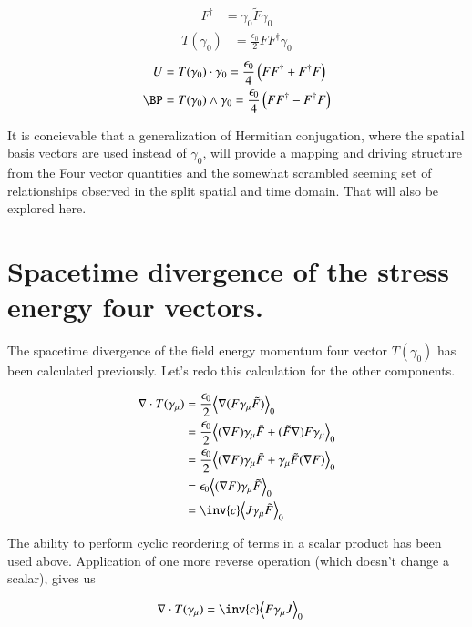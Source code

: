 \documentclass{article}
\begin{document}
\begin{align}
F^\dagger &= \gamma_0 \tilde{F} \gamma_0
\end{align}
\begin{align}
T(\gamma_0) &= \frac{\epsilon_0}{2} F F^\dagger \gamma_0
\end{align}
\begin{align}
U &= T(\gamma_0) \cdot \gamma_0 = \frac{\epsilon_0}{4} \left(F F^\dagger + F^\dagger F \right) \\
\BP &= T(\gamma_0) \wedge \gamma_0 = \frac{\epsilon_0}{4} \left(F F^\dagger - F^\dagger F \right)
\end{align}

It is concievable that a generalization of Hermitian conjugation, where the spatial basis vectors are used instead of $\gamma_0$, will 
provide a mapping and driving structure from the Four vector quantities and the somewhat scrambled seeming set
of relationships observed in the split spatial and time domain.  That will also be explored here.

\section{ Spacetime divergence of the stress energy four vectors. }

The spacetime divergence of the field energy momentum four vector $T(\gamma_0)$ has been calculated previously.  Let's redo this 
calculation for the other components.

\begin{align*}
\grad \cdot T(\gamma_\mu) 
&= \frac{\epsilon_0}{2} \gpgradezero{ \grad (F \gamma_\mu \tilde{F}) } \\
&= \frac{\epsilon_0}{2} \gpgradezero{ (\grad F) \gamma_\mu \tilde{F} + (\tilde{F} \grad) F \gamma_\mu } \\
&= \frac{\epsilon_0}{2} \gpgradezero{ (\grad F) \gamma_\mu \tilde{F} + \gamma_\mu \tilde{F} (\grad F) } \\
&= {\epsilon_0} \gpgradezero{ (\grad F) \gamma_\mu \tilde{F} } \\
&= \inv{c} \gpgradezero{ J \gamma_\mu \tilde{F} } \\
\end{align*}

The ability to perform cyclic reordering of terms in a scalar product has been used above.  Application of one more
reverse operation (which doesn't change a scalar), gives us

\begin{align}
\grad \cdot T(\gamma_\mu) &= \inv{c} \gpgradezero{ F \gamma_\mu J } 
\end{align}
\end{document}
